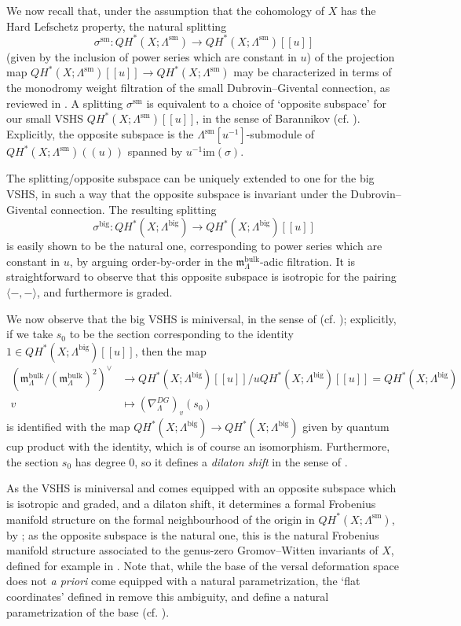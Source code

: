 \documentclass{article}
\newcommand{\fm}{\mathfrak{m}}
\def\big{{\operatorname{big}}}
\def\sm{{\operatorname{sm}}}
\def\im{\mathrm{im}}
\def\bulk{{\operatorname{bulk}}}
\begin{document}
We now recall that, under the assumption that the cohomology of $X$ has the Hard Lefschetz property, the natural splitting
$$\sigma^\sm: QH^*(X;\Lambda^\sm) \to QH^*(X;\Lambda^\sm)[[u]]$$
(given by the inclusion of power series which are constant in $u$) of the projection map $QH^*(X;\Lambda^\sm)[[u]] \to QH^*(X;\Lambda^\sm)$ may be characterized in terms of the monodromy weight filtration of the small Dubrovin--Givental connection, as reviewed in \cite[Sections 2 and 3]{Ganatra2015}. 
A splitting $\sigma^\sm$ is equivalent to a choice of `opposite subspace' for our small VSHS $QH^*(X;\Lambda^\sm)[[u]]$, in the sense of Barannikov \cite{Barannikov} (cf. \cite[Definition 2.10]{CIT}). 
Explicitly, the opposite subspace is the $\Lambda^\sm[u^{-1}]$-submodule of $QH^*(X;\Lambda^\sm)((u))$ spanned by $u^{-1}\im(\sigma)$.

The splitting/opposite subspace can be uniquely extended to one for the big VSHS, in such a way that the opposite subspace is invariant under the Dubrovin--Givental connection. 
The resulting splitting 
$$\sigma^\big: QH^*(X;\Lambda^\big) \to QH^*(X;\Lambda^\big)[[u]]$$
is easily shown to be the natural one, corresponding to power series which are constant in $u$, by arguing order-by-order in the $\fm^\bulk_\Lambda$-adic filtration. 
It is straightforward to observe that this opposite subspace is isotropic for the pairing $\langle-,-\rangle$, and furthermore is graded.

We now observe that the big VSHS is miniversal, in the sense of \cite{Barannikov} (cf. \cite[Definition 2.8]{CIT}); explicitly, if we take $s_0$ to be the section corresponding to the identity $1 \in QH^*(X;\Lambda^\big)[[u]]$, then the map
\begin{align*}
    (\fm^\bulk_\Lambda/(\fm^\bulk_\Lambda)^2)^\vee & \to QH^*(X;\Lambda^\big)[[u]]/uQH^*(X;\Lambda^\big)[[u]] = QH^*(X;\Lambda^\big) \\
    v & \mapsto (\nabla^{DG}_\Lambda)_v (s_0)
\end{align*}
is identified with the map $QH^*(X;\Lambda^\big) \to QH^*(X;\Lambda^\big)$ given by quantum cup product with the identity, which is of course an isomorphism. 
Furthermore, the section $s_0$ has degree $0$, so it defines a \emph{dilaton shift} in the sense of \cite[Section 2.2.2]{CIT}.

As the VSHS is miniversal and comes equipped with an opposite subspace which is isotropic and graded, and a dilaton shift, it determines a formal Frobenius manifold structure on the formal neighbourhood of the origin in $QH^*(X;\Lambda^\sm)$, by \cite[Proposition 2.11]{CIT}; as the opposite subspace is the natural one, this is the natural Frobenius manifold structure associated to the genus-zero Gromov--Witten invariants of $X$, defined for example in \cite{Manin}. 
Note that, while the base of the versal deformation space does not \emph{a priori} come equipped with a natural parametrization, the `flat coordinates' defined in \cite[Section 2.2.2]{CIT} remove this ambiguity, and define a natural parametrization of the base (cf. \cite[Section 2.5]{Ganatra2015}). 
\end{document}
